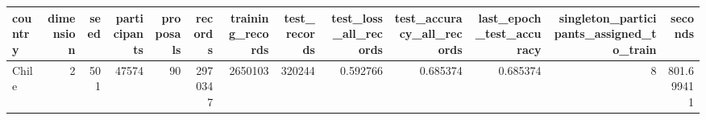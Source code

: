 \begin{tabular}{lrrrrrrrrrrrr}
\toprule
country & dimension & seed & participants & proposals & records & training_records & test_records & test_loss_all_records & test_accuracy_all_records & last_epoch_test_accuracy & singleton_participants_assigned_to_train & seconds \\
\midrule
Chile & 2 & 501 & 47574 & 90 & 2970347 & 2650103 & 320244 & 0.592766 & 0.685374 & 0.685374 & 8 & 801.699411 \\
\bottomrule
\end{tabular}
